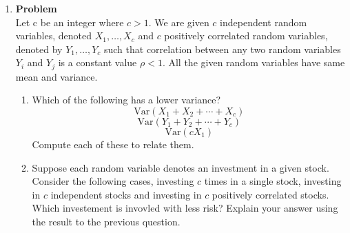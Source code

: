 \documentclass[12pt]{article}
\newenvironment{Ex}{\textbf{Problem}\vspace{.75em}\\}{}
\begin{document}
\begin{enumerate}
\begin{Ex}
    Hint: Define a Bernoulli random variable $A_t$ that is equal to 1
    if and only if the $t$th toss resulted in 1. Note that $X_1 =
    A_1+A_2+\ldots+A_n$.
    \begin{solution} \hfill \vspace{.75em} \\
      Intuitively, the $\text{Cov}(X_1 , X_2)$ would be 0 since the
      random variables $X_1$ and $X_2$ are independent because each
      toss is independent of the other and each outcome has an equally
      likely, equally independent outcome. Since the covariance
      between independent variables is 0, then we can assume that
      $\text{Cov}(X_1 , X_2) = 0$.
      \\\\ {\color{red} \huge CHECK}
    \end{solution}
  \end{Ex}
\item
  \begin{Ex}
    Let c be an integer where $c > 1$. We are given $c$ independent
    random variables, denoted $X_1, \ldots ,X_c$ and $c$ positively
    correlated random variables, denoted by $Y_1, \ldots, Y_c$ such
    that correlation between any two random variables $Y_i$ and $Y_j$
    is a constant value $\rho < 1$. All the given random variables
    have same mean and variance.
    \begin{enumerate}
    \item Which of the following has a lower variance?
      \begin{equation}
        \label{eq:6-question-eq-0}
        \text{Var}(X_1 + X_2 + \cdots + X_c)
      \end{equation}
      \begin{equation}
        \label{eq:6-question-eq-1}
        \text{Var}(Y_1 + Y_2 + \cdots + Y_c)
      \end{equation}
      \begin{equation}
        \label{eq:6-question-eq-2}
        \text{Var}(cX_1)
      \end{equation}
      Compute each of these to relate them.
    \item Suppose each random variable denotes an investment in a
      given stock. Consider the following cases, investing $c$ times
      in a single stock, investing in $c$ independent stocks and
      investing in $c$ positively correlated stocks. Which investement
      is invovled with less risk? Explain your answer using the result
      to the previous question.

\end{enumerate}
\end{Ex}
\end{enumerate}
\end{document}
